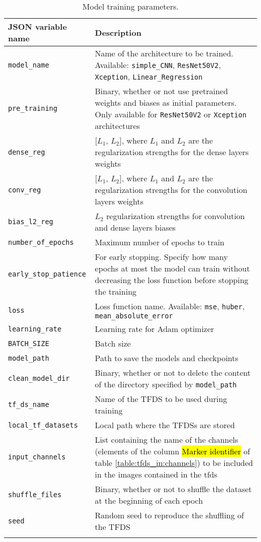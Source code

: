 \begin{longtable}{>{\centering\arraybackslash}m{\mylengtha} | m{\mylengthb}}
    \hline
    JSON variable name & Description \\
    \hline
    \texttt{model\_name} & Name of the architecture to be trained. Available: \texttt{simple\_CNN}, \texttt{ResNet50V2}, \texttt{Xception}, \texttt{Linear\_Regression} \\
    \hline
    \texttt{pre\_training} & Binary, whether or not use pretrained weights and biases as initial parameters. Only available for \texttt{ResNet50V2} or \texttt{Xception} architectures \\
    \hline
    \texttt{dense\_reg} & [$L_1$, $L_2$], where $L_1$ and $L_2$ are the regularization strengths for the dense layers weights\\
    \hline
    \texttt{conv\_reg} & [$L_1$, $L_2$], where $L_1$ and $L_2$ are the regularization strengths for the convolution layers weights \\
    \hline
    \texttt{bias\_l2\_reg} & $L_2$ regularization strengths for convolution and dense layers biases \\
    \hline
    \texttt{number\_of\_epochs} & Maximum number of epochs to train \\
    \hline
    \texttt{early\_stop\_patience} & For early stopping. Specify how many epochs at most the model can train without decreasing the loss function before stopping the training \\
    \hline
    \texttt{loss} & Loss function name. Available: \texttt{mse}, \texttt{huber}, \texttt{mean\_absolute\_error} \\
    \hline
    \texttt{learning\_rate} & Learning rate for Adam optimizer \\
    \hline
    \texttt{BATCH\_SIZE} & Batch size \\
    \hline
    \texttt{model\_path} & Path to save the models and checkpoints \\
    \hline
    \texttt{clean\_model\_dir} & Binary, whether or not to delete the content of the directory specified by \texttt{model\_path} \\
    \hline
    \texttt{tf\_ds\_name} & Name of the TFDS to be used during training\\
    \hline
    \texttt{local\_tf\_datasets} & Local path where the TFDSs are stored \\
    \hline
    \texttt{input\_channels} & List containing the name of the channels (elements of the column \hl{Marker identifier} of table \ref{table:tfds_in:channels}) to be included in the images contained in the \gls{tfds} \\
    \hline
    \texttt{shuffle\_files} & Binary, whether or not to shuffle the dataset at the beginning of each epoch \\
    \hline
    \texttt{seed} & Random seed to reproduce the shuffling of the TFDS \\
    \hline
  \caption{Model training parameters.}
  \label{table:model_train_in:params}
\end{longtable}

